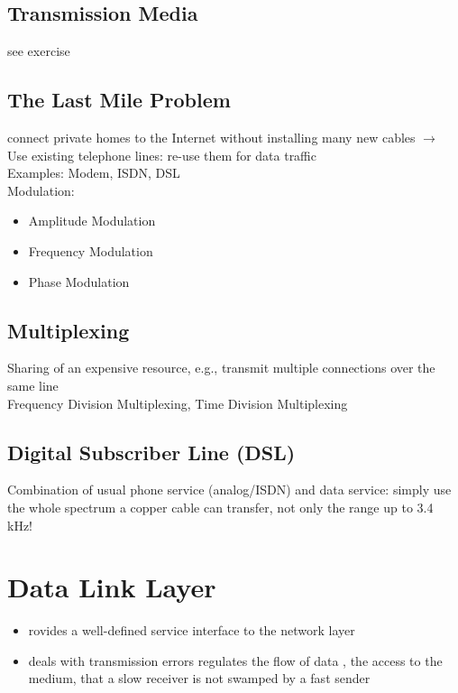 \documentclass[11pt,ngerman]{article}
\begin{document}
\subsection{Transmission	Media}
see exercise
\subsection{The	Last	Mile	Problem}
connect	private	homes	to	
the	Internet	without	installing	many	new	cables $\rightarrow$ Use	existing	telephone	lines:	re-use	them	for	data	
traffic\\

Examples: Modem, ISDN, DSL\\

Modulation:
\begin{itemize}[noitemsep]
\item Amplitude Modulation
\item Frequency Modulation
\item Phase Modulation
\end{itemize}

\subsection{Multiplexing}
Sharing	of	an	expensive	resource,	e.g.,	transmit	multiple	connections	over	
the	same	line\\
Frequency	Division	Multiplexing, Time	Division	Multiplexing

\subsection{Digital	Subscriber	Line	(DSL)}
Combination	of	usual	phone	service	
(analog/ISDN)	and	data	service: 
simply	use	the	whole	spectrum	a	copper	
cable	can	transfer,	not	only	the	range	up	to	
3.4	kHz!


\section{Data Link Layer}

\begin{itemize}[noitemsep]
\item rovides	a	well-defined	service	
interface	to	the	network	layer
\item deals	with	transmission	errors
regulates
the	flow	of	data	, 
the	access	to	the	medium, 
that	a	slow	receiver	is	not	swamped	by	
a	fast	sender
\end{itemize}
\end{document}
